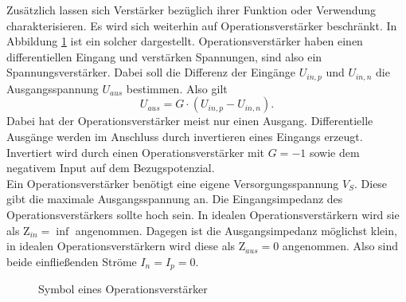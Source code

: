 Zusätzlich lassen sich Verstärker bezüglich ihrer Funktion oder Verwendung  charakterisieren. Es wird sich weiterhin auf Operationsverstärker beschränkt. In Abbildung \ref{fig:OpAmp} ist ein solcher dargestellt. Operationsverstärker haben einen differentiellen Eingang und verstärken Spannungen, sind also ein Spannungsverstärker. Dabei soll die Differenz der Eingänge $U_{in,p}$ und $U_{in,n}$ die Ausgangsspannung $U_{aus}$ bestimmen. Also gilt
\begin{equation}
U_{aus} = G \cdot \left( U_{in,p} - U_{in,n}\right).
\end{equation} Dabei hat der Operationsverstärker meist nur einen Ausgang. Differentielle Ausgänge werden im Anschluss durch invertieren eines Eingangs erzeugt. Invertiert wird durch einen Operationsverstärker mit $G = -1$ sowie dem negativem Input auf dem Bezugspotenzial.\\ 
Ein Operationsverstärker benötigt eine eigene Versorgungsspannung $V_{S}$. Diese gibt die maximale Ausgangsspannung an. Die Eingangsimpedanz des Operationsverstärkers sollte hoch sein. In idealen Operationsverstärkern wird sie als $\text{Z}_{in} = \inf$ angenommen. Dagegen ist die Ausgangsimpedanz möglichst klein, in idealen Operationsverstärkern wird diese als $\text{Z}_{aus} = 0$ angenommen. Also sind beide einfließenden Ströme $I_n = I_p = 0$.
\begin{figure}[tbp]
  \centering
  
  \caption{Symbol eines Operationsverstärker}
  \label{fig:OpAmp}
\end{figure}
